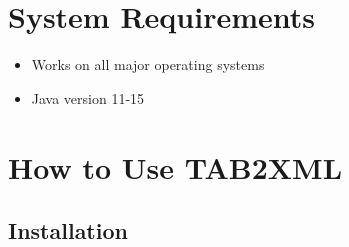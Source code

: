 \documentclass[11pt]{article}
\date{\today}
\title{}
\begin{document}
\tableofcontents

\newpage
\section{System Requirements}
\label{sec:org743dbd9}
\begin{itemize}
\item Works on all major operating systems
\item Java version 11-15
\end{itemize}
\section{How to Use TAB2XML}
\label{sec:org87d8fb1}
\subsection{Installation}
\label{sec:orge1b5e53}
\end{document}
